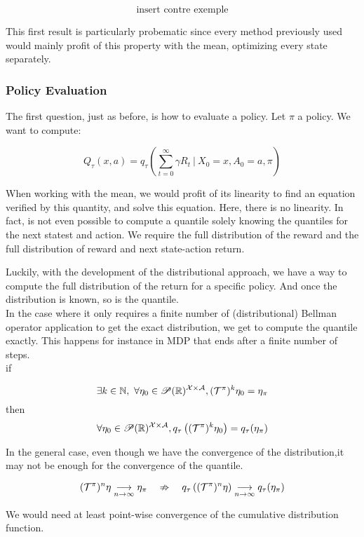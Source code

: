 \[ \text{insert contre exemple} \]

This first result is particularly probematic since every method previously used would mainly profit of this property with the mean, optimizing every state separately.
 
\subsubsection*{Policy Evaluation}

The first question, just as before, is how to evaluate a policy. Let $\pi$ a policy. We want to compute:

\[ Q_\tau(x,a) = q_\tau\left(\sum_{t = 0}^{\infty} \gamma R_t \ |\ X_0 = x, A_0 = a, \pi\right) \]

When working with the mean, we would profit of its linearity to find an equation verified by this quantity, and solve this equation. Here, there is no linearity. In fact, is not even possible to compute a quantile solely knowing the quantiles for the next statest and action. We require the full distribution of the reward and the full distribution of reward and next state-action return. 

Luckily, with the development of the distributional approach, we have a 
way to compute the full distribution of the return for a specific policy. And once the distribution is known, so is the quantile.\\

In the case where it only requires a finite number of (distributional) Bellman operator application to get the exact distribution, we get to compute the quantile exactly. This happens for instance in MDP that ends after a finite number of steps.\\

if

\[\exists k \in \mathbb{N},\ \forall \eta_0 \in \mathscr{P}(\mathbb{R})^{\mathcal{X} \times \mathcal{A}}, (\mathcal{T}^\pi)^k\eta_0 = \eta_\pi \] 
then
\[ \forall \eta_0 \in \mathscr{P}(\mathbb{R})^{\mathcal{X} \times \mathcal{A}}, q_\tau\left((\mathcal{T}^\pi)^k\eta_0\right) = q_\tau(\eta_\pi)\]

In the general case, even though we have the convergence of the distribution,it may not be enough for the convergence of the quantile.

\[ (\mathcal{T}^\pi )^n \eta \underset{n \rightarrow \infty}{\longrightarrow} \eta_\pi \quad \nRightarrow \quad q_\tau\left((\mathcal{T}^\pi )^n \eta\right) \underset{n \rightarrow \infty}{\longrightarrow} q_\tau(\eta_\pi)  \]

We would need at least point-wise convergence of the cumulative distribution function.

